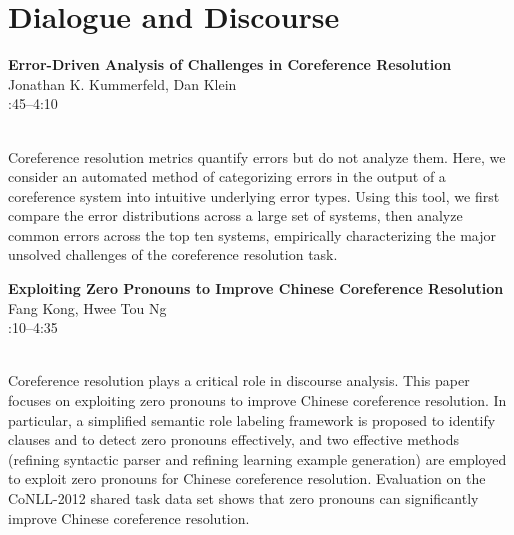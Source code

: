 \documentclass[twoside,makeidx]{book}
\renewcommand{\normalsize}{\fontsize{8}{9}\selectfont}
\renewcommand{\small}{\fontsize{7}{8}\selectfont}
\begin{document}
\section{Dialogue and Discourse}
\vspace{-1em}
\par\vspace{2em}\noindent%
\begin{minipage}{\linewidth}%
\begin{center}
\textbf{\normalsize Error-Driven Analysis of Challenges in Coreference Resolution}\\
\normalsize  Jonathan K. Kummerfeld,  Dan Klein\\
{\small 3:45--4:10}\\
\end{center}
\end{minipage}\\[0.5em]
\nopagebreak%
\noindent%
{\small Coreference resolution metrics quantify errors but do not analyze them.  Here, we consider an automated method of categorizing errors in the output of a coreference system into intuitive underlying error types.  Using this tool, we first compare the error distributions across a large set of systems, then analyze common errors across the top ten systems, empirically characterizing the major unsolved challenges of the coreference resolution task.}
\par\vspace{2em}\noindent%
\begin{minipage}{\linewidth}%
\begin{center}
\textbf{\normalsize Exploiting Zero Pronouns to Improve Chinese Coreference Resolution}\\
\normalsize  Fang Kong,  Hwee Tou Ng\\
{\small 4:10--4:35}\\
\end{center}
\end{minipage}\\[0.5em]
\nopagebreak%
\noindent%
{\small Coreference resolution plays a critical role in discourse analysis. This paper focuses on exploiting zero pronouns to improve Chinese coreference resolution. In particular, a simplified semantic role labeling framework is proposed to identify clauses and to detect zero pronouns effectively, and two effective methods (refining syntactic parser and refining learning example generation) are employed to exploit zero pronouns for Chinese coreference resolution. Evaluation on the CoNLL-2012 shared task data set shows that zero pronouns can significantly improve Chinese coreference resolution.}
\end{document}
